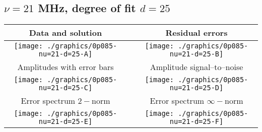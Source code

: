 

% 

\clearpage{}
\break{}

\subsection{$\nu = 21$ MHz, degree of fit $d = 25$}

\begin{table}[h]
    \begin{center}
        \begin{tabular}{ccc}
            Data and solution & \quad & Residual errors \\\hline
            \texttt{[image: ./graphics/0p085-nu=21-d=25-A]} &&
            \texttt{[image: ./graphics/0p085-nu=21-d=25-B]} \\[15pt]
            Amplitudes with error bars && Amplitude signal--to--noise \\\hline
            \texttt{[image: ./graphics/0p085-nu=21-d=25-C]} &&
            \texttt{[image: ./graphics/0p085-nu=21-d=25-D]} \\[15pt]
            Error spectrum $2-$norm && Error spectrum $\infty-$norm \\\hline
            \texttt{[image: ./graphics/0p085-nu=21-d=25-E]} &&
            \texttt{[image: ./graphics/0p085-nu=21-d=25-F]} \\[15pt]
        \end{tabular}
    \end{center}
\label{fig:elev=85, nu=21}
\end{table}



\endinput
